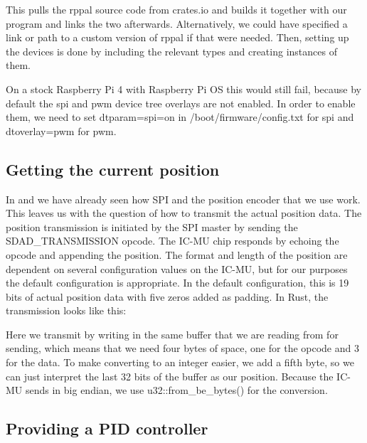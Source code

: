 

This pulls the rppal source code from crates.io and builds it together with our program and links the two afterwards.
Alternatively, we could have specified a link or path to a custom version of rppal if that were needed.
Then, setting up the devices is done by including the relevant types and creating instances of them.



On a stock Raspberry Pi 4 with Raspberry Pi OS this would still fail, because by default the spi and pwm device tree overlays are not enabled.
In order to enable them, we need to set dtparam=spi=on in /boot/firmware/config.txt for spi and dtoverlay=pwm for pwm.

\subsection{Getting the current position}

In  and  we have already seen how SPI and the position encoder that we use work.
This leaves us with the question of how to transmit the actual position data.
The position transmission is initiated by the SPI master by sending the SDAD\_TRANSMISSION opcode.
The IC-MU chip responds by echoing the opcode and appending the position.
The format and length of the position are dependent on several configuration values on the IC-MU, but for our purposes the default configuration is appropriate.
In the default configuration, this is 19 bits of actual position data with five zeros added as padding.
In Rust, the transmission looks like this:



Here we transmit by writing in the same buffer that we are reading from for sending, which means that we need four bytes of space, one for the opcode and 3 for the data.
To make converting to an integer easier, we add a fifth byte, so we can just interpret the last 32 bits of the buffer as our position.
Because the IC-MU sends in big endian, we use u32::from\_be\_bytes() for the conversion.

\subsection{Providing a PID controller}


